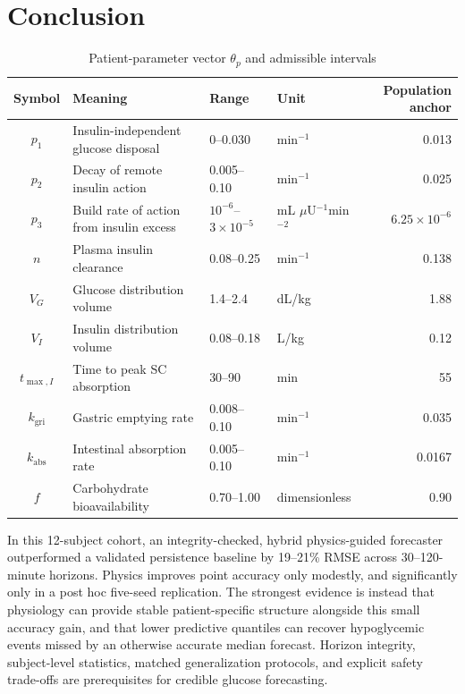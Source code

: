 \documentclass[journal]{IEEEtran}
\begin{document}
\section{Conclusion}
\begin{table}[t]
\centering
\caption{Patient-parameter vector $\theta_p$ and admissible intervals}
\label{tab:params}
\footnotesize
\begin{tabular}{clllr}
\toprule
Symbol & Meaning & Range & Unit & Population anchor \\
\midrule
$p_1$ & Insulin-independent glucose disposal & 0--0.030 & min$^{-1}$ & 0.013 \\
$p_2$ & Decay of remote insulin action & 0.005--0.10 & min$^{-1}$ & 0.025 \\
$p_3$ & Build rate of action from insulin excess & $10^{-6}$--$3\times10^{-5}$ & mL $\mu$U$^{-1}$min$^{-2}$ & $6.25\times10^{-6}$ \\
$n$ & Plasma insulin clearance & 0.08--0.25 & min$^{-1}$ & 0.138 \\
$V_G$ & Glucose distribution volume & 1.4--2.4 & dL/kg & 1.88 \\
$V_I$ & Insulin distribution volume & 0.08--0.18 & L/kg & 0.12 \\
$t_{\max,I}$ & Time to peak SC absorption & 30--90 & min & 55 \\
$k_{\text{gri}}$ & Gastric emptying rate & 0.008--0.10 & min$^{-1}$ & 0.035 \\
$k_{\text{abs}}$ & Intestinal absorption rate & 0.005--0.10 & min$^{-1}$ & 0.0167 \\
$f$ & Carbohydrate bioavailability & 0.70--1.00 & dimensionless & 0.90 \\
\bottomrule
\end{tabular}
\end{table}

In this 12-subject cohort, an integrity-checked, hybrid physics-guided forecaster outperformed a validated persistence baseline by 19--21\% RMSE across 30--120-minute horizons. Physics improves point accuracy only modestly, and significantly only in a post hoc five-seed replication. The strongest evidence is instead that physiology can provide stable patient-specific structure alongside this small accuracy gain, and that lower predictive quantiles can recover hypoglycemic events missed by an otherwise accurate median forecast. Horizon integrity, subject-level statistics, matched generalization protocols, and explicit safety trade-offs are prerequisites for credible glucose forecasting.
\end{document}
